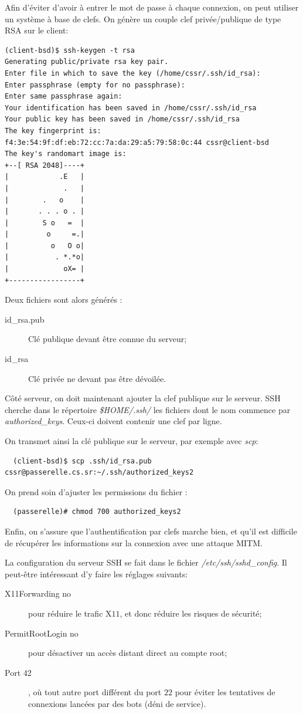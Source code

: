 \documentclass[a4paper]{article}
\begin{document}
Afin d'éviter d'avoir à entrer le mot de passe à chaque connexion, on peut
utiliser un système à base de clefs. On génère un couple clef privée/publique
de type RSA sur le client:
\begin{verbatim}
(client-bsd)$ ssh-keygen -t rsa
Generating public/private rsa key pair.
Enter file in which to save the key (/home/cssr/.ssh/id_rsa): 
Enter passphrase (empty for no passphrase): 
Enter same passphrase again: 
Your identification has been saved in /home/cssr/.ssh/id_rsa
Your public key has been saved in /home/cssr/.ssh/id_rsa
The key fingerprint is:
f4:3e:54:9f:df:eb:72:cc:7a:da:29:a5:79:58:0c:44 cssr@client-bsd
The key's randomart image is:
+--[ RSA 2048]----+
|            .E   |
|             .   |
|        .   o    |
|       . . . o . |
|        S o   =  |
|         o     =.|
|          o   O o|
|           . *.*o|
|             oX= |
+-----------------+
\end{verbatim}

Deux fichiers sont alors générés :
\begin{description}
	\item[id\_rsa.pub]	Clé publique devant être connue du serveur;
	\item[id\_rsa] 		Clé privée ne devant pas être dévoilée.
\end{description}

Côté serveur, on doit maintenant ajouter la clef publique sur le
serveur. SSH cherche dans le répertoire \textit{\$HOME/.ssh/} les
fichiers dont le nom commence par \textit{authorized\_keys}. Ceux-ci
doivent contenir une clef par ligne.

On transmet ainsi la clé publique sur le serveur, par exemple avec
\textit{scp}:
\begin{verbatim}
  (client-bsd)$ scp .ssh/id_rsa.pub cssr@passerelle.cs.sr:~/.ssh/authorized_keys2
\end{verbatim}

On prend soin d'ajuster les permissions du fichier :
\begin{verbatim}
  (passerelle)# chmod 700 authorized_keys2
\end{verbatim}
 
Enfin, on s'assure que l'authentification par clefs marche bien, et
qu'il est difficile de récupérer les informations sur la connexion
avec une attaque MITM.

La configuration du serveur SSH se fait dans le fichier \textit{/etc/ssh/sshd\_config}.
Il peut-être intéressant d'y faire les réglages suivants:
\begin{description}
	\item[X11Forwarding no] pour réduire le trafic X$11$, et donc réduire les
	risques de sécurité;
	\item[PermitRootLogin no] pour désactiver un accès distant direct au compte
	root;
	\item[Port 42], où tout autre port différent du port $22$ pour éviter les
	tentatives de connexions lancées par des bots (déni de service).
\end{description}
\end{document}

